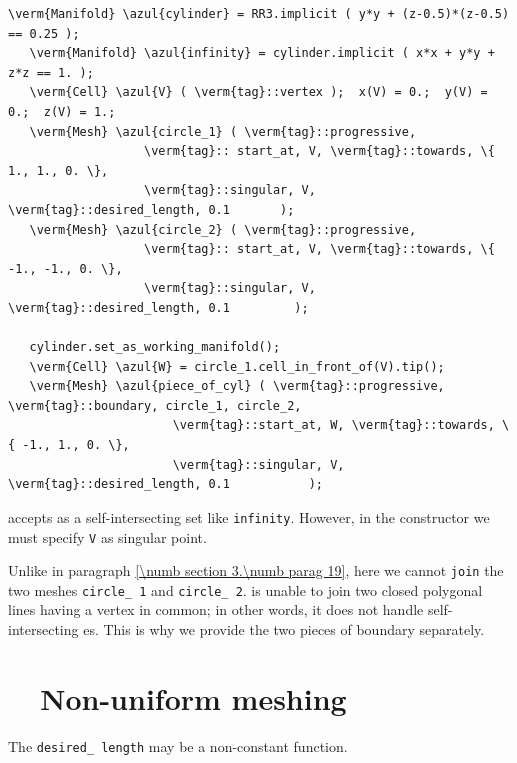 \begin{Verbatim}[commandchars=\\\{\},formatcom=\small\tt,frame=single,
   label=parag-\ref{\numb section 3.\numb parag 21}.cpp,rulecolor=\color{coment},
   baselinestretch=0.94,framesep=2mm                                            ]
   \verm{Manifold} \azul{cylinder} = RR3.implicit ( y*y + (z-0.5)*(z-0.5) == 0.25 );
   \verm{Manifold} \azul{infinity} = cylinder.implicit ( x*x + y*y + z*z == 1. );
   \verm{Cell} \azul{V} ( \verm{tag}::vertex );  x(V) = 0.;  y(V) = 0.;  z(V) = 1.;
   \verm{Mesh} \azul{circle_1} ( \verm{tag}::progressive,
                   \verm{tag}:: start_at, V, \verm{tag}::towards, \{ 1., 1., 0. \},
                   \verm{tag}::singular, V, \verm{tag}::desired_length, 0.1       );
   \verm{Mesh} \azul{circle_2} ( \verm{tag}::progressive,
                   \verm{tag}:: start_at, V, \verm{tag}::towards, \{ -1., -1., 0. \},
                   \verm{tag}::singular, V, \verm{tag}::desired_length, 0.1         );

   cylinder.set_as_working_manifold();
   \verm{Cell} \azul{W} = circle_1.cell_in_front_of(V).tip();
   \verm{Mesh} \azul{piece_of_cyl} ( \verm{tag}::progressive, \verm{tag}::boundary, circle_1, circle_2,
                       \verm{tag}::start_at, W, \verm{tag}::towards, \{ -1., 1., 0. \},
                       \verm{tag}::singular, V, \verm{tag}::desired_length, 0.1           );
\end{Verbatim}

{\ManiFEM} accepts as {\small\tt {}} a self-intersecting set like {\small\tt infinity}.
However, in the {\small\tt {}} constructor we must specify {\small\tt V} as singular point.

Unlike in paragraph \ref{\numb section 3.\numb parag 19}, here we cannot {\small\tt join} the
two meshes {\small\tt circle\_\,1} and {\small\tt circle\_\,2}.
{\ManiFEM} is unable to join two closed polygonal lines having a vertex in common;
in other words, it does not handle self-intersecting {\small\tt {}}es.
This is why we provide the two pieces of boundary separately.


\section{~~Non-uniform meshing}\label{\numb section 3.\numb parag 22}

The {\small\tt desired\_\,length} may be a non-constant function.

